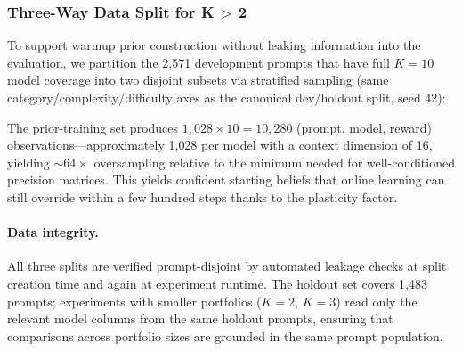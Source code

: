 \subsubsection{Three-Way Data Split for K\,$>$\,2}
\label{sec:three_way_split}

To support warmup prior construction without leaking information into the evaluation, we partition the 2{,}571 development prompts that have full $K{=}10$ model coverage into two disjoint subsets via stratified sampling (same category/complexity/difficulty axes as the canonical dev/holdout split, seed 42):

\begin{table}[htbp]
\centering
\caption{Three-way data split for all experiments.}
\label{tab:three_way_split}
\small
{}
\end{table}

The prior-training set produces $1{,}028 \times 10 = 10{,}280$ (prompt, model, reward) observations---approximately 1{,}028 per model with a context dimension of 16, yielding ${\sim}64\times$ oversampling relative to the minimum needed for well-conditioned precision matrices.
This yields confident starting beliefs that online learning can still override within a few hundred steps thanks to the plasticity factor.

\paragraph{Data integrity.}
All three splits are verified prompt-disjoint by automated leakage checks at split creation time and again at experiment runtime.
The holdout set covers 1{,}483 prompts; experiments with smaller portfolios ($K{=}2$, $K{=}3$) read only the relevant model columns from the same holdout prompts, ensuring that comparisons across portfolio sizes are grounded in the same prompt population.

